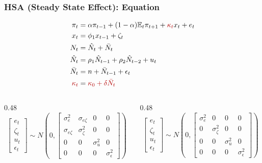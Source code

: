 \documentclass{beamer}
\begin{document}
\begin{frame}
  \frametitle{HSA (Steady State Effect): Equation}
    \begin{equation*}
    \begin{aligned}
        \pi_t &= \alpha \pi_{t-1} + (1-\alpha)\mathbb{E}_t \pi_{t+1} + {\color{red!70!black}\kappa_t} x_t + e_t \\
        x_t &= \phi_1 x_{t-1} + \zeta_t \\
        N_t &= \hat{N}_t + \bar{N}_t \\
        \hat{N}_t &= \rho_1 \hat{N}_{t-1} + \rho_2 \hat{N}_{t-2} + u_t \\
        \bar{N}_t &= n + \bar{N}_{t-1} + \epsilon_t \\
        {\color{red!70!black}\kappa_t} &= {\color{red!70!black}\kappa_0 + \delta \bar{N}_t}
    \end{aligned}
    \end{equation*}
  \begin{columns}[T,onlytextwidth]
    \begin{column}{0.48\textwidth}
      \centering
      \scriptsize
      \begin{equation*}
        \begin{bmatrix}
          e_t \\ \zeta_t \\ u_t \\ \epsilon_t
        \end{bmatrix}
        \sim N\!\left(
        0,
        \begin{bmatrix}
          \sigma_e^2 & \sigma_{e\zeta} & 0 & 0 \\
          \sigma_{e\zeta} & \sigma_\zeta^2 & 0 & 0 \\
          0 & 0 & \sigma_u^2 & 0 \\
          0 & 0 & 0 & \sigma_\epsilon^2
        \end{bmatrix}
        \right)
      \end{equation*}
    \end{column}

    \begin{column}{0.48\textwidth}
      \centering
      \scriptsize
      \begin{equation*}
        \begin{bmatrix}
          e_t \\ \zeta_t \\ u_t \\ \epsilon_t
        \end{bmatrix}
        \sim N\!\left(
        0,
        \begin{bmatrix}
          \sigma_e^2 & 0 & 0 & 0 \\
          0 & \sigma_\zeta^2 & 0 & 0 \\
          0 & 0 & \sigma_u^2 & 0 \\
          0 & 0 & 0 & \sigma_\epsilon^2
        \end{bmatrix}
        \right)
      \end{equation*}
    \end{column}
  \end{columns}
\end{frame}
\end{document}

